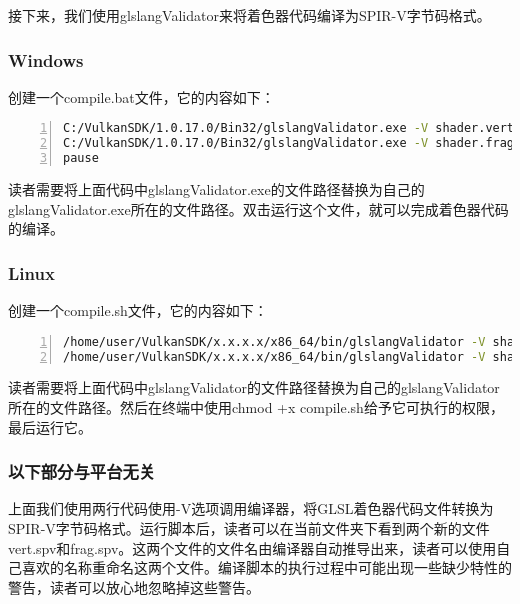 \documentclass{ctexart}
\begin{document}
接下来，我们使用glslangValidator来将着色器代码编译为SPIR-V字节码格式。

\subsubsection{Windows}

创建一个compile.bat文件，它的内容如下：

\begin{lstlisting}[language={bash},keywordstyle=\color{blue!70},commentstyle=\color{red!50!green!50!blue!50},frame=shadowbox, rulesepcolor=\color{red!20!green!20!blue!20},basicstyle=\small,numbers=left, numberstyle=\tiny,breaklines=true]
C:/VulkanSDK/1.0.17.0/Bin32/glslangValidator.exe -V shader.vert
C:/VulkanSDK/1.0.17.0/Bin32/glslangValidator.exe -V shader.frag
pause
\end{lstlisting}

读者需要将上面代码中glslangValidator.exe的文件路径替换为自己的glslangValidator.exe所在的文件路径。双击运行这个文件，就可以完成着色器代码的编译。

\subsubsection{Linux}

创建一个compile.sh文件，它的内容如下：

\begin{lstlisting}[language={bash},keywordstyle=\color{blue!70},commentstyle=\color{red!50!green!50!blue!50},frame=shadowbox, rulesepcolor=\color{red!20!green!20!blue!20},basicstyle=\small,numbers=left, numberstyle=\tiny,breaklines=true]
/home/user/VulkanSDK/x.x.x.x/x86_64/bin/glslangValidator -V shader.vert
/home/user/VulkanSDK/x.x.x.x/x86_64/bin/glslangValidator -V shader.frag
\end{lstlisting}

读者需要将上面代码中glslangValidator的文件路径替换为自己的glslangValidator所在的文件路径。然后在终端中使用chmod +x compile.sh给予它可执行的权限，最后运行它。

\subsubsection{以下部分与平台无关}

上面我们使用两行代码使用-V选项调用编译器，将GLSL着色器代码文件转换为SPIR-V字节码格式。运行脚本后，读者可以在当前文件夹下看到两个新的文件vert.spv和frag.spv。这两个文件的文件名由编译器自动推导出来，读者可以使用自己喜欢的名称重命名这两个文件。编译脚本的执行过程中可能出现一些缺少特性的警告，读者可以放心地忽略掉这些警告。
\end{document}
